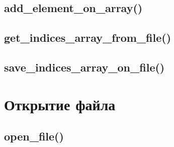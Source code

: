 \documentclass[12pt, a4paper]{article}
\begin{document}



\subsection{add\_element\_on\_array()}






\subsection{get\_indices\_array\_from\_file()}






\subsection{save\_indices\_array\_on\_file()}






\section{Открытие файла}


\subsection{open\_file()}
\end{document}

